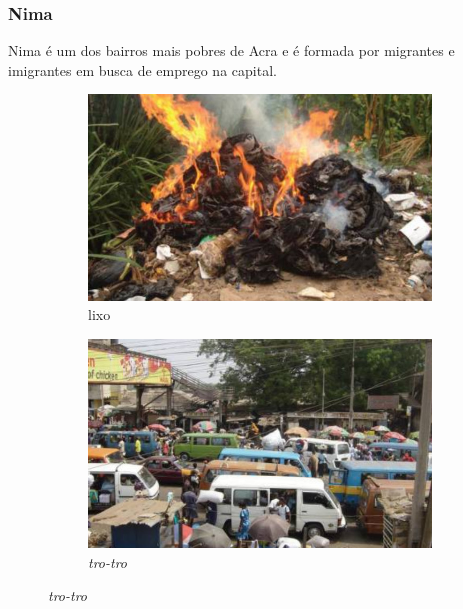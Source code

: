 \begin{frame}
	\frametitle{Nima}
	  Nima é um dos bairros mais pobres de Acra e é formada por migrantes e imigrantes em busca de emprego na capital.
	 
	\begin{figure}[H]
		\centering
		\begin{subfigure}[b]{0.4\linewidth}
			 \includegraphics[width=1\linewidth]{../../inputs/images/zheng/arku3.jpeg}
			\caption{lixo}
		\end{subfigure}%
		\hspace{0.5cm}
		\begin{subfigure}[b]{0.4\linewidth}
			 \includegraphics[width=1\linewidth]{../../inputs/images/zheng/arku4.jpeg}
			\caption{\textit{tro-tro}}
		\end{subfigure}
	\end{figure}
\end{frame}

